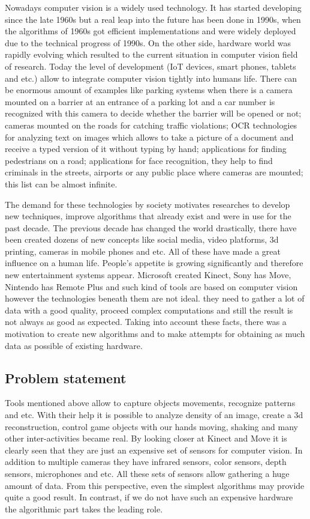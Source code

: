 \documentclass[../main]{subfiles}
\begin{document}
Nowadays computer vision is a widely used technology. It has started developing since the late 1960s but a real leap into the future has been done in 1990s, when the algorithms of 1960s got efficient implementations and were widely deployed due to the technical progress of 1990s. On the other side, hardware world was rapidly evolving which resulted to the current situation in computer vision field of research. Today the level of development (\ac{IoT} devices, smart phones, tablets and etc.) allow to integrate computer vision tightly into humans life. There can be enormous amount of examples like parking systems when there is a camera mounted on a barrier at an entrance of a parking lot and a car number is recognized with this camera to decide whether the barrier will be opened or not; cameras mounted on the roads for catching traffic violations; OCR technologies for analyzing text on images which allows to take a picture of a document and receive a typed version of it without typing by hand; applications for finding pedestrians on a road; applications for face recognition, they help to find criminals in the streets, airports or any public place where cameras are mounted; this list can be almost infinite.

The demand for these technologies by society motivates researches to develop new techniques, improve algorithms that already exist and were in use for the past decade. The previous decade has changed the world drastically, there have been created dozens of new concepts like social media, video platforms, 3d printing, cameras in mobile phones and etc. All of these have made a great influence on a human life. People's appetite is growing significantly and therefore new entertainment systems appear. Microsoft created Kinect, Sony has Move, Nintendo has Remote Plus and such kind of tools are based on computer vision however the technologies beneath them are not ideal. they need to gather a lot of data with a good quality, proceed complex computations and still the result is not always as good as expected. Taking into account these facts, there was a motivation to create new algorithms and to make attempts for obtaining as much data as possible of existing hardware. 

\subsection{Problem statement}

Tools mentioned above allow to capture objects movements, recognize patterns and etc. With their help it is possible to analyze density of an image, create a 3d reconstruction, control game objects with our hands moving, shaking and many other inter-activities became real. By looking closer at Kinect and Move it is clearly seen that they are just an expensive set of sensors for computer vision. In addition to multiple cameras they have infrared sensors, color sensors, depth sensors, microphones and etc. All these sets of sensors allow gathering a huge amount of data. From this perspective, even the simplest algorithms may provide quite a good result. In contrast, if we do not have such an expensive hardware the algorithmic part takes the leading role.
\end{document}
